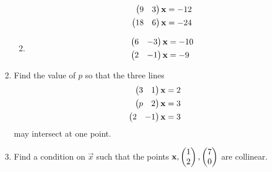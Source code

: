 \documentclass[journal,12pt,twocolumn]{IEEEtran}
\renewcommand\thesection{\arabic{section}}
\begin{document}
\begin{enumerate}[label=\thesection.\arabic*.,ref=\thesection.\theenumi]
\begin{enumerate}[itemsep=2pt]
\begin{align}
\begin{split}
\begin{pmatrix}9 & 3 \end{pmatrix}\mathbf{x}&=-12
\\
\begin{pmatrix}18 & 6 \end{pmatrix}\mathbf{x}&=-24
\end{split}
\label{line/6/1.0.2}
\end{align}
\item
\begin{align}
\begin{split}
\begin{pmatrix}6 & -3 \end{pmatrix}\mathbf{x}&=-10
\\
\begin{pmatrix}2 & -1 \end{pmatrix}\mathbf{x}&=-9
\end{split}
\label{line/6/1.0.3}
\end{align}
\end{enumerate}
%
\solution
\item Find the value of $p$ so that the three lines 
%
\begin{align}
\begin{pmatrix}3 & 1\end{pmatrix}\mathbf{x} &= 2
\\
\begin{pmatrix}p & 2\end{pmatrix}\mathbf{x} &= 3
\\
\begin{pmatrix}2 & -1\end{pmatrix}\mathbf{x} &= 3
\end{align}
%
may intersect at one point.
%
\solution
%
\item Find a condition on $\vec{x}$  such that the points $\mathbf{x}, \begin{pmatrix}1\\2\end{pmatrix}, \begin{pmatrix}7\\0\end{pmatrix}$ are collinear.
\\
\solution
\end{enumerate}
\end{document}
